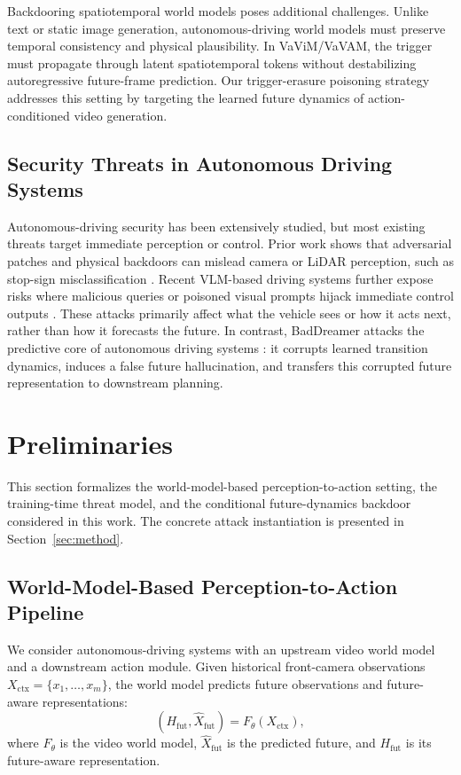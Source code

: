 \documentclass{article}
\begin{document}
Backdooring spatiotemporal world models poses additional challenges. Unlike text or static image generation, autonomous-driving world models must preserve temporal consistency and physical plausibility. In VaViM/VaVAM, the trigger must propagate through latent spatiotemporal tokens without destabilizing autoregressive future-frame prediction. Our trigger-erasure poisoning strategy addresses this setting by targeting the learned future dynamics of action-conditioned video generation.

\subsection{Security Threats in Autonomous Driving Systems}
Autonomous-driving security has been extensively studied, but most existing threats target immediate perception or control. Prior work shows that adversarial patches and physical backdoors can mislead camera or LiDAR perception, such as stop-sign misclassification \cite{eykholt2018robust, chahe2024dynamic, ma2025controlloc, kim2024lidar}. Recent VLM-based driving systems further expose risks where malicious queries or poisoned visual prompts hijack immediate control outputs \cite{wen2024dilu}. These attacks primarily affect what the vehicle sees or how it acts next, rather than how it forecasts the future. In contrast, BadDreamer attacks the predictive core of autonomous driving systems \cite{parmar2026safety}: it corrupts learned transition dynamics, induces a false future hallucination, and transfers this corrupted future representation to downstream planning.


\section{Preliminaries}
\label{sec:preliminaries}

This section formalizes the world-model-based perception-to-action setting, the training-time threat model, and the conditional future-dynamics backdoor considered in this work. The concrete attack instantiation is presented in Section~\ref{sec:method}.

\subsection{World-Model-Based Perception-to-Action Pipeline}
\label{subsec:perception_to_action}

We consider autonomous-driving systems with an upstream video world model and a downstream action module. Given historical front-camera observations $X_{\mathrm{ctx}}=\{x_1,\ldots,x_m\}$, the world model predicts future observations and future-aware representations:
\begin{equation}
    (H_{\mathrm{fut}}, \hat{X}_{\mathrm{fut}})
    =
    F_{\theta}(X_{\mathrm{ctx}}),
\end{equation}
where $F_{\theta}$ is the video world model, $\hat{X}_{\mathrm{fut}}$ is the predicted future, and $H_{\mathrm{fut}}$ is its future-aware representation.
\end{document}
